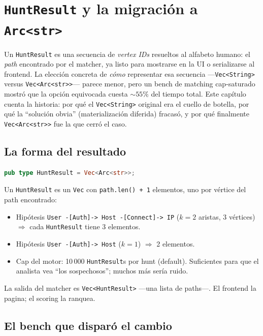 \chapter{\texttt{HuntResult} y la migración a \texttt{Arc<str>}}
\label{cap:hunt-result}

\begin{intuicion}
Un \texttt{HuntResult} es una secuencia de \emph{vertex IDs}
resueltos al alfabeto humano: el \emph{path} encontrado por el
matcher, ya listo para mostrarse en la UI o serializarse al
frontend. La elección concreta de \emph{cómo} representar esa
secuencia ---\texttt{Vec<String>} versus \texttt{Vec<Arc<str>>}---
parece menor, pero un bench de matching cap-saturado mostró que la
opción equivocada cuesta \(\sim 55\%\) del tiempo total. Este
capítulo cuenta la historia: por qué el \texttt{Vec<String>}
original era el cuello de botella, por qué la ``solución obvia''
(materialización diferida) fracasó, y por qué finalmente
\texttt{Vec<Arc<str>>} fue la que cerró el caso.
\end{intuicion}

\section{La forma del resultado}

\begin{lstlisting}[language=Rust]
pub type HuntResult = Vec<Arc<str>>;
\end{lstlisting}

\noindent
Un \texttt{HuntResult} es un \texttt{Vec} con \texttt{path.len() +
1} elementos, uno por vértice del path encontrado:

\begin{itemize}
    \item Hipótesis \texttt{User -[Auth]-> Host -[Connect]-> IP}
    (\(k = 2\) aristas, \(3\) vértices) $\Rightarrow$ cada
    \texttt{HuntResult} tiene 3 elementos.
    \item Hipótesis \texttt{User -[Auth]-> Host} (\(k = 1\)) $\Rightarrow$
    2 elementos.
    \item Cap del motor: 10\,000 \texttt{HuntResult}s por hunt
    (default). Suficientes para que el analista vea ``los
    sospechosos''; muchos más sería ruido.
\end{itemize}

\noindent
La salida del matcher es \texttt{Vec<HuntResult>} ---una lista de
paths---. El frontend la pagina; el scoring la ranquea.

\section{El bench que disparó el cambio}

